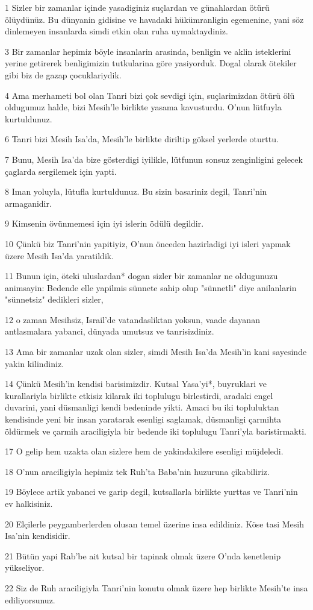 \par 1 Sizler bir zamanlar içinde yasadiginiz suçlardan ve günahlardan ötürü ölüydünüz. Bu dünyanin gidisine ve havadaki hükümranligin egemenine, yani söz dinlemeyen insanlarda simdi etkin olan ruha uymaktaydiniz.
\par 3 Bir zamanlar hepimiz böyle insanlarin arasinda, benligin ve aklin isteklerini yerine getirerek benligimizin tutkularina göre yasiyorduk. Dogal olarak ötekiler gibi biz de gazap çocuklariydik.
\par 4 Ama merhameti bol olan Tanri bizi çok sevdigi için, suçlarimizdan ötürü ölü oldugumuz halde, bizi Mesih'le birlikte yasama kavusturdu. O'nun lütfuyla kurtuldunuz.
\par 6 Tanri bizi Mesih Isa'da, Mesih'le birlikte diriltip göksel yerlerde oturttu.
\par 7 Bunu, Mesih Isa'da bize gösterdigi iyilikle, lütfunun sonsuz zenginligini gelecek çaglarda sergilemek için yapti.
\par 8 Iman yoluyla, lütufla kurtuldunuz. Bu sizin basariniz degil, Tanri'nin armaganidir.
\par 9 Kimsenin övünmemesi için iyi islerin ödülü degildir.
\par 10 Çünkü biz Tanri'nin yapitiyiz, O'nun önceden hazirladigi iyi isleri yapmak üzere Mesih Isa'da yaratildik.
\par 11 Bunun için, öteki uluslardan* dogan sizler bir zamanlar ne oldugunuzu animsayin: Bedende elle yapilmis sünnete sahip olup "sünnetli" diye anilanlarin "sünnetsiz" dedikleri sizler,
\par 12 o zaman Mesihsiz, Israil'de vatandasliktan yoksun, vaade dayanan antlasmalara yabanci, dünyada umutsuz ve tanrisizdiniz.
\par 13 Ama bir zamanlar uzak olan sizler, simdi Mesih Isa'da Mesih'in kani sayesinde yakin kilindiniz.
\par 14 Çünkü Mesih'in kendisi barisimizdir. Kutsal Yasa'yi*, buyruklari ve kurallariyla birlikte etkisiz kilarak iki toplulugu birlestirdi, aradaki engel duvarini, yani düsmanligi kendi bedeninde yikti. Amaci bu iki topluluktan kendisinde yeni bir insan yaratarak esenligi saglamak, düsmanligi çarmihta öldürmek ve çarmih araciligiyla bir bedende iki toplulugu Tanri'yla baristirmakti.
\par 17 O gelip hem uzakta olan sizlere hem de yakindakilere esenligi müjdeledi.
\par 18 O'nun araciligiyla hepimiz tek Ruh'ta Baba'nin huzuruna çikabiliriz.
\par 19 Böylece artik yabanci ve garip degil, kutsallarla birlikte yurttas ve Tanri'nin ev halkisiniz.
\par 20 Elçilerle peygamberlerden olusan temel üzerine insa edildiniz. Köse tasi Mesih Isa'nin kendisidir.
\par 21 Bütün yapi Rab'be ait kutsal bir tapinak olmak üzere O'nda kenetlenip yükseliyor.
\par 22 Siz de Ruh araciligiyla Tanri'nin konutu olmak üzere hep birlikte Mesih'te insa ediliyorsunuz.

